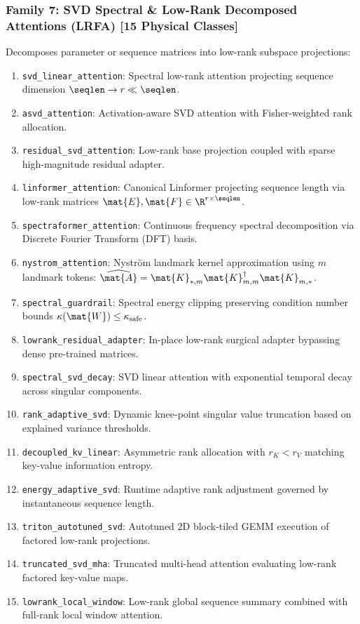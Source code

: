 \subsubsection{Family 7: SVD Spectral \& Low-Rank Decomposed Attentions (LRFA) [15 Physical Classes]}
Decomposes parameter or sequence matrices into low-rank subspace projections:
\begin{enumerate}
    \item \texttt{svd\_linear\_attention}: Spectral low-rank attention projecting sequence dimension $\seqlen \to r \ll \seqlen$.
    \item \texttt{asvd\_attention}: Activation-aware SVD attention with Fisher-weighted rank allocation.
    \item \texttt{residual\_svd\_attention}: Low-rank base projection coupled with sparse high-magnitude residual adapter.
    \item \texttt{linformer\_attention}: Canonical Linformer projecting sequence length via low-rank matrices $\mat{E}, \mat{F} \in \R^{r \times \seqlen}$.
    \item \texttt{spectraformer\_attention}: Continuous frequency spectral decomposition via Discrete Fourier Transform (DFT) basis.
    \item \texttt{nystrom\_attention}: Nystr\"om landmark kernel approximation using $m$ landmark tokens: $\widehat{\mat{A}} = \mat{K}_{*,m} \mat{K}_{m,m}^\dagger \mat{K}_{m,*}$.
    \item \texttt{spectral\_guardrail}: Spectral energy clipping preserving condition number bounds $\kappa(\mat{W}) \le \kappa_{\text{safe}}$.
    \item \texttt{lowrank\_residual\_adapter}: In-place low-rank surgical adapter bypassing dense pre-trained matrices.
    \item \texttt{spectral\_svd\_decay}: SVD linear attention with exponential temporal decay across singular components.
    \item \texttt{rank\_adaptive\_svd}: Dynamic knee-point singular value truncation based on explained variance thresholds.
    \item \texttt{decoupled\_kv\_linear}: Asymmetric rank allocation with $r_K < r_V$ matching key-value information entropy.
    \item \texttt{energy\_adaptive\_svd}: Runtime adaptive rank adjustment governed by instantaneous sequence length.
    \item \texttt{triton\_autotuned\_svd}: Autotuned 2D block-tiled GEMM execution of factored low-rank projections.
    \item \texttt{truncated\_svd\_mha}: Truncated multi-head attention evaluating low-rank factored key-value maps.
    \item \texttt{lowrank\_local\_window}: Low-rank global sequence summary combined with full-rank local window attention.
\end{enumerate}

